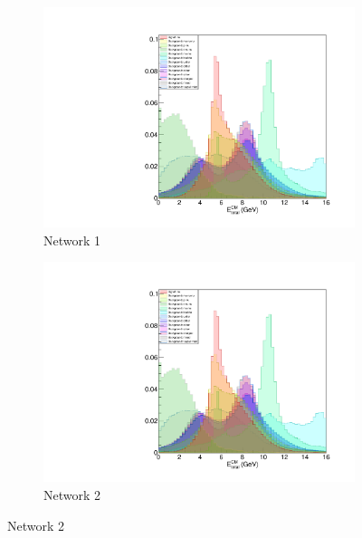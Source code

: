 \documentclass[12pt]{thesis}  %
\begin{document}
   \begin{figure}[h]
        \centering
        \begin{subfigure}[b]{0.475\textwidth}
            \centering
            \includegraphics[width=\textwidth]{images/test.pdf}
            \caption[Network2]%
            {{\small Network 1}}    
            \label{fig:mean and std of net14}
        \end{subfigure}
        \hfill
        \begin{subfigure}[b]{0.475\textwidth}  
            \centering 
            \includegraphics[width=\textwidth]{images/test.pdf}
            \caption[]%
            {{\small Network 2}}    
            \label{fig:mean and std of net24}
        \end{subfigure}
    \end{figure}
\end{document}

